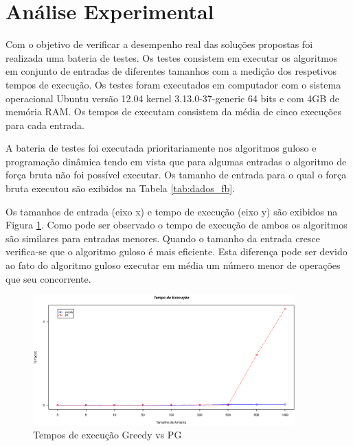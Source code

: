 \documentclass[12pt]{article}
\begin{document}
\section{Análise Experimental}
\label{sec:experimentos}

Com o objetivo de verificar a desempenho real das soluções propostas foi realizada uma bateria de testes. Os testes consistem em executar os algoritmos em conjunto de entradas de diferentes tamanhos com a medição dos respetivos tempos de execução. Os testes foram executados em computador com o sistema operacional Ubuntu versão 12.04 kernel 3.13.0-37-generic 64 bits e com 4GB de memória RAM. Os tempos de executam consistem da média de cinco execuções para cada entrada.

A bateria de testes foi executada prioritariamente nos algoritmos guloso e programação dinâmica tendo em vista que para algumas entradas o algoritmo de força bruta não foi possível executar. Os tamanho de entrada para o qual o força bruta executou são exibidos na Tabela \ref{tab:dados_fb}{}.

\begin{table}[!t]

\renewcommand{\arraystretch}{1.3}
\label{tab:dados_fb}
\caption{Tempo de execução do algoritmo de força bruta}
\centering
{}	
\end{table}

Os tamanhos de entrada (eixo x) e tempo de execução (eixo y) são exibidos na Figura \ref{fig:dados_greedy_pg}. Como pode ser observado o tempo de execução de ambos os algoritmos são similares para entradas menores. Quando o tamanho da entrada cresce verifica-se que o algoritmo guloso é mais eficiente. Esta diferença pode ser devido ao fato do algoritmo guloso executar em média um número menor de operações que seu concorrente.


\begin{figure}[ht]
\centering
\includegraphics[width=0.9\textwidth]{plot_greedy_pd.eps}
\caption{Tempos de execução Greedy vs PG}
\label{fig:dados_greedy_pg}
\end{figure}
\end{document}

